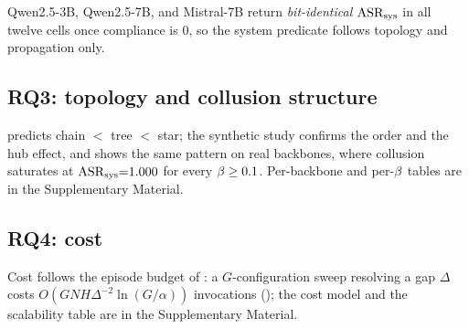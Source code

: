 Qwen2.5-3B, Qwen2.5-7B, and Mistral-7B return \emph{bit-identical} $\mathrm{ASR}_{\mathrm{sys}}$ in all twelve
cells once compliance is $0$, so the system predicate follows topology and propagation only.

\subsection{RQ3: topology and collusion structure}
 predicts chain $<$ tree $<$ star; the synthetic study confirms the
order and the hub effect, and  shows the same pattern on real backbones,
where collusion saturates at $\mathrm{ASR}_{\mathrm{sys}}{=}1.000$ for every $\beta\ge0.1$. Per-backbone and
per-$\beta$ tables are in the Supplementary Material.

\subsection{RQ4: cost}
\label{sec:rq4}
Cost follows the episode budget of : a $G$-configuration sweep resolving a gap
$\Delta$ costs $O(GNH\Delta^{-2}\ln(G/\alpha))$ invocations (); the cost model
and the scalability table are in the Supplementary Material.
